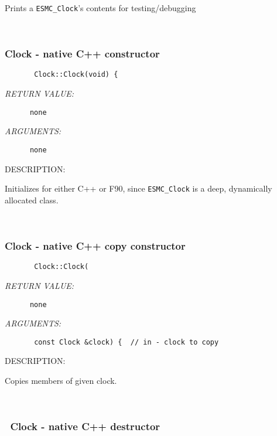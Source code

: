        Prints a {\tt ESMC\_Clock}'s contents for testing/debugging
   
 
\mbox{}\hrulefill\ 
 
\subsubsection [Clock] {Clock - native C++ constructor}


  
\begin{verbatim}       Clock::Clock(void) {\end{verbatim}{\em RETURN VALUE:}
\begin{verbatim}      none\end{verbatim}{\em ARGUMENTS:}
\begin{verbatim}      none\end{verbatim}
{\sf DESCRIPTION:\\ }


        Initializes for either C++ or F90, since {\tt ESMC\_Clock} is a deep,
        dynamically allocated class.
   
 
\mbox{}\hrulefill\ 
 
\subsubsection [Clock] {Clock - native C++ copy constructor}


  
\begin{verbatim}       Clock::Clock(\end{verbatim}{\em RETURN VALUE:}
\begin{verbatim}      none\end{verbatim}{\em ARGUMENTS:}
\begin{verbatim}       const Clock &clock) {  // in - clock to copy\end{verbatim}
{\sf DESCRIPTION:\\ }


        Copies members of given clock.
   
 
\mbox{}\hrulefill\ 
 
\subsubsection [~Clock] {~Clock - native C++ destructor}


